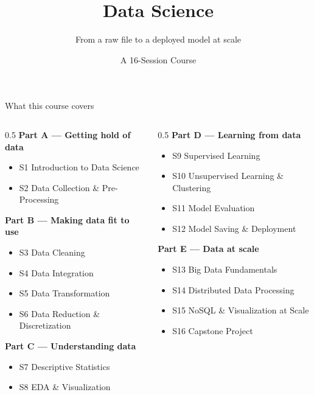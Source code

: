 \documentclass[10pt,aspectratio=169]{beamer}
\title{Data Science}
\subtitle{From a raw file to a deployed model at scale}
\author{A 16-Session Course}
\date{}
\begin{document}
\maketitle

\begin{frame}{What this course covers}
\setlength{\itemsep}{0pt}
\begin{columns}[T]
\begin{column}{0.5\textwidth}
\textbf{Part A --- Getting hold of data}
\begin{itemize}\footnotesize
  \item S1 Introduction to Data Science
  \item S2 Data Collection \& Pre-Processing
\end{itemize}
\textbf{Part B --- Making data fit to use}
\begin{itemize}\footnotesize
  \item S3 Data Cleaning
  \item S4 Data Integration
  \item S5 Data Transformation
  \item S6 Data Reduction \& Discretization
\end{itemize}
\textbf{Part C --- Understanding data}
\begin{itemize}\footnotesize
  \item S7 Descriptive Statistics
  \item S8 EDA \& Visualization
\end{itemize}
\end{column}
\begin{column}{0.5\textwidth}
\textbf{Part D --- Learning from data}
\begin{itemize}\footnotesize
  \item S9 Supervised Learning
  \item S10 Unsupervised Learning \& Clustering
  \item S11 Model Evaluation
  \item S12 Model Saving \& Deployment
\end{itemize}
\textbf{Part E --- Data at scale}
\begin{itemize}\footnotesize
  \item S13 Big Data Fundamentals
  \item S14 Distributed Data Processing
  \item S15 NoSQL \& Visualization at Scale
  \item S16 Capstone Project
\end{itemize}
\end{column}
\end{columns}
\end{frame}
\end{document}
